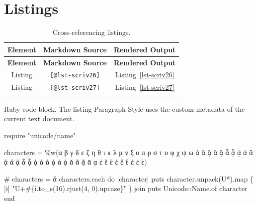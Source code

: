 \documentclass[
  12pt,
  a4paper,
  oneside,
  numbers=noenddot,
  titlepage,
  toclink=all,
  toc=bibliography]{scrbook}
\newenvironment{Shaded}{\begin{snugshade}}{\end{snugshade}}
\newcommand{\AttributeTok}[1]{\textcolor[rgb]{0.40,0.45,0.13}{#1}}
\newcommand{\CharTok}[1]{\textcolor[rgb]{0.13,0.47,0.30}{#1}}
\newcommand{\CommentTok}[1]{\textcolor[rgb]{0.37,0.37,0.37}{#1}}
\newcommand{\ControlFlowTok}[1]{\textcolor[rgb]{0.00,0.23,0.31}{#1}}
\newcommand{\DataTypeTok}[1]{\textcolor[rgb]{0.68,0.00,0.00}{#1}}
\newcommand{\DecValTok}[1]{\textcolor[rgb]{0.68,0.00,0.00}{#1}}
\newcommand{\FunctionTok}[1]{\textcolor[rgb]{0.28,0.35,0.67}{#1}}
\newcommand{\KeywordTok}[1]{\textcolor[rgb]{0.00,0.23,0.31}{#1}}
\newcommand{\NormalTok}[1]{\textcolor[rgb]{0.00,0.23,0.31}{#1}}
\newcommand{\OtherTok}[1]{\textcolor[rgb]{0.00,0.23,0.31}{#1}}
\newcommand{\SpecialCharTok}[1]{\textcolor[rgb]{0.37,0.37,0.37}{#1}}
\newcommand{\StringTok}[1]{\textcolor[rgb]{0.13,0.47,0.30}{#1}}
\newcommand{\VerbatimStringTok}[1]{\textcolor[rgb]{0.13,0.47,0.30}{#1}}
\theoremstyle{definition}
\theoremstyle{definition}
\theoremstyle{definition}
\theoremstyle{plain}
\theoremstyle{plain}
\theoremstyle{plain}
\theoremstyle{plain}
\theoremstyle{plain}
\theoremstyle{remark}
\begin{document}
\newpage{}

\hypertarget{sec-scriv25}{%
\section{Listings}\label{sec-scriv25}}

\hypertarget{tbl-scriv25}{}
\begin{longtable}[]{@{}ccc@{}}
\toprule\noalign{}
\textbf{Element} & \textbf{Markdown Source} & \textbf{Rendered
Output} \\
\midrule\noalign{}
\endfirsthead
\toprule\noalign{}
\textbf{Element} & \textbf{Markdown Source} & \textbf{Rendered
Output} \\
\midrule\noalign{}
\endhead
\bottomrule\noalign{}
\endlastfoot
Listing & \texttt{{[}@lst-scriv26{]}} &
\protect\hypertarget{cite_80}{}{\label{cite_80}Listing~\ref{lst-scriv26}} \\
Listing & \texttt{{[}@lst-scriv27{]}} &
\protect\hypertarget{cite_81}{}{\label{cite_81}Listing~\ref{lst-scriv27}} \\
\caption{\label{tbl-scriv25}Cross-referencing listings.}\tabularnewline
\end{longtable}

\begin{codelisting}

\caption{Ruby code block. The listing Paragraph Style uses the custom
metadata of the current text document.}

\hypertarget{lst-scriv26}{%
\label{lst-scriv26}}%
\begin{Shaded}
\begin{Highlighting}[numbers=left,,]
\FunctionTok{require} \StringTok{"unicode/name"}

\NormalTok{characters }\KeywordTok{=}\OtherTok{ \%w(}\StringTok{α β γ δ ε ζ η θ ι κ λ μ ν ξ ο π ρ σ τ υ φ χ ψ ω }
\StringTok{ἀ ἄ ᾄ ἂ ᾂ ἆ ᾆ ᾀ ἁ ἅ ᾅ ἃ ᾃ ἇ ᾇ ᾁ ά ά ᾴ ὰ ᾲ ᾰ ᾶ ᾷ ᾱ ᾳ ἐ ἔ ἒ ἑ ἕ ἓ έ έ ὲ}\OtherTok{)}

\CommentTok{\# characters = \textquotesingle{}ἄ\textquotesingle{}}
\NormalTok{characters}\AttributeTok{.each} \ControlFlowTok{do} \KeywordTok{|}\NormalTok{character}\KeywordTok{|}
  \FunctionTok{puts}\NormalTok{ character}\AttributeTok{.unpack}\NormalTok{(}\VerbatimStringTok{\textquotesingle{}U*\textquotesingle{}}\NormalTok{)}\AttributeTok{.map} \KeywordTok{\{} \KeywordTok{|}\NormalTok{i}\KeywordTok{|} 
  \StringTok{"U+}\SpecialCharTok{\#\{}\NormalTok{i}\AttributeTok{.to\_s}\NormalTok{(}\DecValTok{16}\NormalTok{)}\AttributeTok{.rjust}\NormalTok{(}\DecValTok{4}\NormalTok{, }\CharTok{\textquotesingle{}0\textquotesingle{}}\NormalTok{)}\AttributeTok{.upcase}\SpecialCharTok{\}}\StringTok{"}
  \KeywordTok{\}}\AttributeTok{.join}
  \FunctionTok{puts} \DataTypeTok{Unicode}\KeywordTok{::}\DataTypeTok{Name}\AttributeTok{.of}\NormalTok{ character}
\ControlFlowTok{end}
\end{Highlighting}
\end{Shaded}

\end{codelisting}
\end{document}
